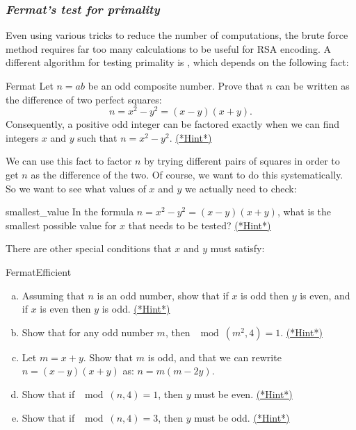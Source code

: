 \subsubsection*{\emph{Fermat's test for primality}}
Even using various tricks to reduce the number of computations, the brute force method requires far too many calculations to be useful for RSA encoding. A different algorithm for testing primality is , which depends on the following fact:

\begin{exercise}{Fermat}
Let $n= ab$ be an odd composite number. Prove that $n$ can be written
as the difference of two perfect squares:
$$
n = x^2 - y^2 = (x-y)(x+y).
$$
Consequently, a positive odd integer can be factored exactly when we
can find integers $x$ and $y$ such that $n = x^2 - y^2$.
\hyperref[sec:crypt:hints]{(*Hint*)} 
\end{exercise} 
We can use this fact to factor $n$ by trying different pairs of squares in order to get $n$ as the difference of the two.  Of course, we want to do this systematically. So we want to see what values of $x$ and $y$ we actually need to check:

\begin{exercise}{smallest_value}
In the formula  $n = x^2 - y^2 = (x-y)(x+y)$,  what is the smallest possible value for $x$ that needs to be tested?
\hyperref[sec:crypt:hints]{(*Hint*)}
\end{exercise}

There are other special conditions that $x$ and $y$ must satisfy:

\begin{exercise}{FermatEfficient}
\begin{enumerate}[(a)]
\item
Assuming that $n$ is an odd number, show that if $x$ is odd then $y$ is even, and if $x$ is even then $y$ is odd.
\hyperref[sec:crypt:hints]{(*Hint*)}
\item
Show that for any odd number $m$, then $\mod(m^2,4) = 1$.
\hyperref[sec:crypt:hints]{(*Hint*)}
\item
Let $m = x + y$. Show that $m$ is odd, and that we can rewrite  $n  = (x-y)(x+y)$ as: $n = m(m-2y)$. 
\item
Show that if $\mod(n,4)=1$, then $y$ must be even.
\hyperref[sec:crypt:hints]{(*Hint*)}
\item
Show that if $\mod(n,4)=3$, then $y$ must be odd.
\hyperref[sec:crypt:hints]{(*Hint*)}
\end{enumerate}
\end{exercise}

